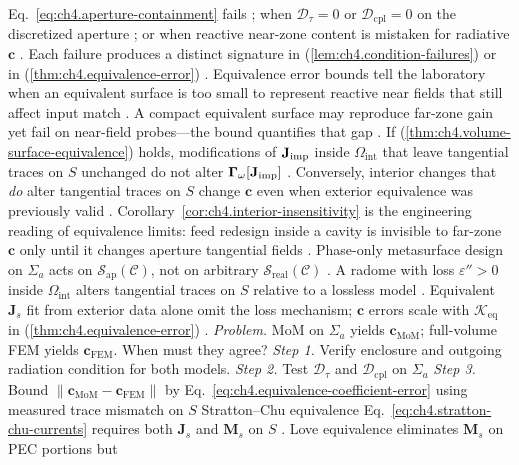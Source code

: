 Eq.~\eqref{eq:ch4.aperture-containment} fails \cite{collin2001}; when \(\mathcal{D}_{\tau}=0\) or
\(\mathcal{D}_{\mathrm{cpl}}=0\) on the discretized aperture \cite{harrington2001}; or when reactive
near-zone content is mistaken for radiative \(\mathbf{c}\) \cite{stratton1941}. Each failure
produces a distinct signature in (\ref{lem:ch4.condition-failures}) or in
(\ref{thm:ch4.equivalence-error}) \cite{harrington2001}.
Equivalence error bounds tell the laboratory when an equivalent surface is too small to represent reactive near fields that still affect input match \cite{stratton1941}. A compact equivalent surface may reproduce far-zone gain yet fail on near-field probes---the bound quantifies that gap \cite{devaney2004}.
\label{cor:ch4.interior-insensitivity}
If (\ref{thm:ch4.volume-surface-equivalence}) holds, modifications of \(\mathbf{J}_{\mathrm{imp}}\) inside
\(\Omega_{\mathrm{int}}\) that leave tangential traces on \(S\) unchanged do not alter
\(\boldsymbol{\Gamma}_\omega[\mathbf{J}_{\mathrm{imp}}]\) \cite{stratton1941}. Conversely, interior changes that
\emph{do} alter tangential traces on \(S\) change \(\mathbf{c}\) even when exterior equivalence was previously
valid \cite{harrington2001}.
Corollary~\ref{cor:ch4.interior-insensitivity} is the engineering reading of equivalence limits: feed redesign
inside a cavity is invisible to far-zone \(\mathbf{c}\) only until it changes aperture tangential fields
\cite{collin2001}. Phase-only metasurface design on \(\Sigma_{a}\) acts on
\(\mathcal{S}_{\mathrm{ap}}(\mathcal{C})\), not on arbitrary \(\mathcal{S}_{\mathrm{real}}(\mathcal{C})\)
\cite{devaney2004}.
A radome with loss \(\varepsilon''>0\) inside \(\Omega_{\mathrm{int}}\) alters tangential traces on \(S\) relative
to a lossless model \cite{stratton1941}. Equivalent \(\mathbf{J}_{s}\) fit from exterior data
alone omit the loss mechanism; \(\mathbf{c}\) errors scale with \(\mathcal{K}_{\mathrm{eq}}\) in
(\ref{thm:ch4.equivalence-error}) \cite{devaney2004}.
\emph{Problem.} MoM on \(\Sigma_{a}\) yields \(\mathbf{c}_{\mathrm{MoM}}\); full-volume FEM yields
\(\mathbf{c}_{\mathrm{FEM}}\). When must they agree?
\emph{Step 1.} Verify enclosure and outgoing radiation condition for both models.
\emph{Step 2.} Test \(\mathcal{D}_{\tau}\) and \(\mathcal{D}_{\mathrm{cpl}}\) on \(\Sigma_{a}\)
\emph{Step 3.} Bound \(\|\mathbf{c}_{\mathrm{MoM}}-\mathbf{c}_{\mathrm{FEM}}\|\) by
Eq.~\eqref{eq:ch4.equivalence-coefficient-error} using measured trace mismatch on \(S\)
Stratton--Chu equivalence Eq.~\eqref{eq:ch4.stratton-chu-currents} requires both \(\mathbf{J}_{s}\) and
\(\mathbf{M}_{s}\) on \(S\) . Love equivalence eliminates \(\mathbf{M}_{s}\) on PEC portions but
